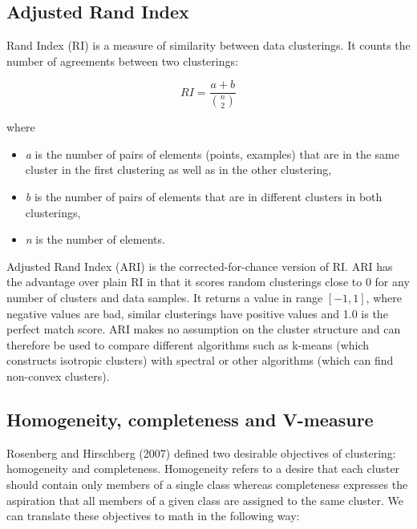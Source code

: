 \documentclass[conference]{IEEEtran}
\begin{document}
\subsection{Adjusted Rand Index}
Rand Index (RI) is a measure of similarity between data clusterings. It counts
the number of agreements between two clusterings:

\begin{equation}
\label{RI}
RI = \frac{a+b}{{n \choose 2}}
\end{equation}

where
\begin{itemize}
    \item \textit{a} is the number of pairs of elements (points, examples) that are in the same cluster in the first clustering
    as well as in the other clustering,
    \item \textit{b} is the number of pairs of elements that are in different clusters in both clusterings,
    \item \textit{n} is the number of elements.
\end{itemize}

Adjusted Rand Index (ARI) is the corrected-for-chance version of RI.
ARI has the advantage over plain RI in that it scores random 
clusterings close to 0 for any number of clusters and data samples. It returns
a value in range $[-1, 1]$, where negative values are bad, similar clusterings have
positive values and 1.0 is the perfect match score. ARI makes no assumption on the cluster
structure and can therefore be used to compare different algorithms such as k-means (which
constructs isotropic clusters) with spectral or other algorithms (which can find non-convex
clusters).

\subsection{Homogeneity, completeness and V-measure}
Rosenberg and Hirschberg (2007) defined two desirable objectives of clustering: homogeneity and
completeness. Homogeneity refers to a desire that each cluster should contain only members
of a single class whereas completeness expresses the aspiration that all members of a given
class are assigned to the same cluster.
We can translate these objectives to math in the following way:
\end{document}
